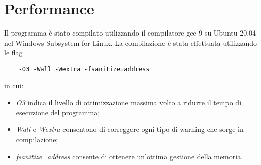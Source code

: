 \documentclass[../main.tex]{subfiles}un
\begin{document}
\section{Performance}
Il programma \`e stato compilato utilizzando il compilatore gcc-9 su Ubuntu 20.04 nel Windows Subsystem for Linux.
La compilazione \`e stata effettuata utilizzando le flag
\begin{verbatim}
    -O3 -Wall -Wextra -fsanitize=address
\end{verbatim}
in cui:
\begin{itemize}
    \item \emph{O3} indica il livello di ottimizzazione massima volto a ridurre il tempo di esecuzione del programma;
    \item \emph{Wall} e \emph{Wextra} consentono di correggere ogni tipo di warning che sorge in compilazione;
    \item \emph{fsanitize=address} consente di ottenere un'ottima gestione della memoria.
\end{itemize}
\end{document}

